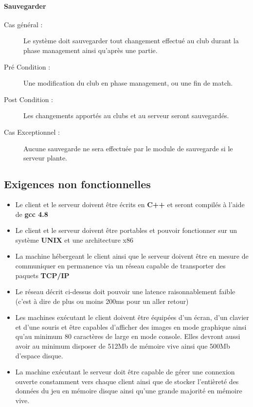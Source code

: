 \documentclass[a4paper]{article}
\begin{document}
\paragraph{Sauvegarder}
\begin{description}
\item[Cas général :] Le système doit sauvegarder tout changement effectué au \gls{club} durant la phase management ainsi qu'après une partie.
\item[Pré Condition  :] Une modification du \gls{club} en phase management, ou une fin de match.
\item[Post Condition :] Les changements apportés au clubs et au serveur seront sauvegardés.
\item[Cas Exceptionnel :] Aucune sauvegarde ne sera effectuée par le module de sauvegarde si le \gls{serveur} plante.
\end{description}


\subsection{Exigences non fonctionnelles}
\label{enf}
\begin{itemize}
\item Le \gls{client} et le \gls{serveur} doivent être écrits en \textbf{C++} et seront compilés à l'aide de \textbf{gcc 4.8}
\item Le \gls{client} et le \gls{serveur} doivent être portables et pouvoir fonctionner sur un système \textbf{UNIX} et une architecture x86
\item La machine hébergeant le \gls{client} ainsi que le \gls{serveur} doivent être en mesure de communiquer en permanence via un réseau capable de transporter des paquets \textbf{TCP/IP}
\item Le réseau décrit ci-dessus doit pouvoir une latence raisonnablement faible (c'est à dire de plus ou moins 200ms pour un aller retour)
\item Les machines exécutant le \gls{client} doivent être équipées d'un écran, d'un clavier et d'une souris et être capables d'afficher des images en mode graphique ainsi qu'au minimum 80 caractères de large en mode console. Elles devront aussi avoir au minimum disposer de 512Mb de mémoire vive ainsi que 500Mb d'espace disque.
\item La machine exécutant le \gls{serveur} doit être capable de gérer une connexion ouverte constamment vers chaque \gls{client} ainsi que de stocker l'entièreté des données du jeu en mémoire disque ainsi qu'une grande majorité en mémoire vive.
\end{itemize}
\end{document}
